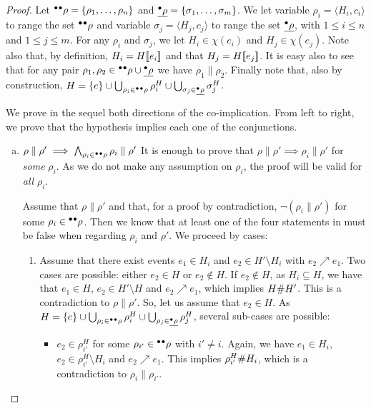 \begin{proof}
Let ${}^\bullet{}^\bullet\rho = \{\rho_1, \ldots, \rho_n\}$ and $\underline{{}^\bullet\rho} =
\{\sigma_1, \ldots, \sigma_m\}$.  We let variable $\rho_i = \langle H_i, c_i
\rangle$ to range the set ${}^\bullet{}^\bullet\rho$ and variable $\sigma_j = \langle
H_j, c_j \rangle$ to range the set $\underline{{}^\bullet\rho}$, with $1 \le i \le n$ and
$1 \le j \le m$.  For any $\rho_i$ and $\sigma_j$, we let $H_i \in \chi (e_i)$
and $H_j \in \chi (e_j)$.  Note also that, by definition, $H_i = H [\![ e_i]\!]$
and that $H_j = H[\![ e_j]\!]$.  It is easy also to see that for any pair $\rho_1,
\rho_2 \in {}^\bullet{}^\bullet\rho \cup \underline{{}^\bullet\rho}$ we have $\rho_1 \parallel
\rho_2$.  Finally note that, also by construction, $H = \{e\} \cup
\bigcup_{\rho_i \in {}^\bullet{}^\bullet\rho} \rho^H_i \cup \bigcup_{\sigma_j \in
\underline{{}^\bullet\rho}} \sigma^H_j$.

We prove in the sequel both directions of the co-implication.  From left to
right, we prove that the hypothesis implies each one of the conjunctions.

\begin{enumerate}[(a)]
\item $\rho \parallel \rho' \implies \bigwedge_{\rho_i \in {}^\bullet{}^\bullet\rho} \rho_i \parallel \rho'$  It is enough to prove that $\rho \parallel
\rho' \implies \rho_i \parallel \rho'$ for \emph{some} $\rho_i$.  As we do not
make any assumption on $\rho_i$, the proof will be valid for \emph{all}
$\rho_i$.

Assume that $\rho \parallel \rho'$ and that, for a proof by contradiction,
$\lnot (\rho_i \parallel \rho')$ for some $\rho_i \in {}^\bullet{}^\bullet\rho$.  Then we
know that at least one of the four statements in  must be
false when regarding $\rho_i$ and $\rho'$.  We proceed by cases:

\begin{enumerate}[1.]
\item Assume that there exist events $e_1 \in H_i$ and $e_2 \in H' \setminus
H_i$ with $e_2 \nearrow e_1$.  Two cases are possible: either $e_2 \in H$ or
$e_2 \notin H$.  If $e_2 \notin H$, as $H_i \subseteq H$, we have that $e_1 \in
H$, $e_2 \in H' \setminus H$ and $e_2 \nearrow e_1$, which implies $H \mathord{\#}
H'$.  This is a contradiction to $\rho \parallel \rho'$.  So, let us assume
that $e_2 \in H$.  As $H = \{e\} \cup \bigcup_{\rho_i \in {}^\bullet{}^\bullet\rho}
\rho^H_i \cup \bigcup_{\rho_j \in \underline{{}^\bullet\rho}} \rho^H_j$, several
sub-cases are possible:

\begin{itemize}
\item $e_2 \in \rho^H_{i'}$ for some $\rho_{i'} \in {}^\bullet{}^\bullet\rho$ with $i'
\not= i$.  Again, we have $e_1 \in H_i$, $e_2 \in \rho^H_{i'} \setminus H_i$
and $e_2 \nearrow e_1$.  This implies $\rho^H_{i'} \mathord{\#} H_i$, which is a
contradiction to $\rho_i \parallel \rho_{i'}$.


\end{itemize}
\end{enumerate}
\end{enumerate}
\end{proof}
